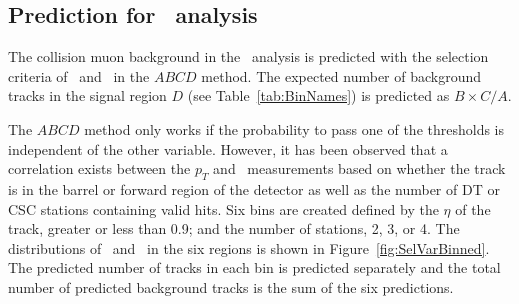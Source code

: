 \subsection{Prediction for \muononly\ analysis \label{sec:MuOnlyPred}}

The collision muon  background in the \muononly\ analysis is predicted with the selection criteria of \invbeta\ and \pt\ in the $ABCD$  method.
The expected number of background tracks in the signal region $D$ (see Table~\ref{tab:BinNames}) is predicted as $B \times C / A$. 

The $ABCD$ method only works if the probability to pass one of the thresholds is independent of the other variable.
However, it has been observed that a correlation exists between the $p_T$ and \invbeta\ measurements based on whether the track is in the barrel or forward
region of the detector as well as the number of DT or CSC stations containing valid hits. 
Six bins are created defined by the $\eta$ of the track, greater or less than 0.9; and the number of stations, 2, 3, or 4.
The distributions of \pt\ and \invbeta\ in the six regions is shown in Figure~\ref{fig:SelVarBinned}.
The predicted number of tracks in each bin is predicted separately and the total number of predicted background tracks is the sum of the six predictions.

